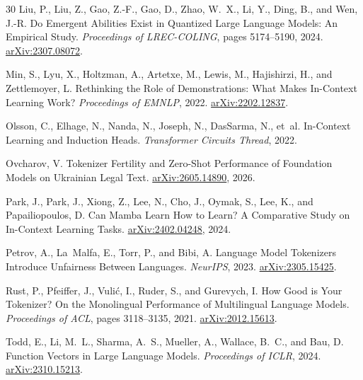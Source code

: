 \documentclass[11pt,a4paper]{article}
\begin{document}
\begin{thebibliography}{30}
Liu, P., Liu, Z., Gao, Z.-F., Gao, D., Zhao, W.~X., Li, Y., Ding, B., and Wen, J.-R.
\newblock Do Emergent Abilities Exist in Quantized Large Language Models: An Empirical Study.
\newblock \emph{Proceedings of LREC-COLING}, pages 5174--5190, 2024.
\newblock \href{https://arxiv.org/abs/2307.08072}{arXiv:2307.08072}.

Min, S., Lyu, X., Holtzman, A., Artetxe, M., Lewis, M., Hajishirzi, H., and Zettlemoyer, L.
\newblock Rethinking the Role of Demonstrations: What Makes In-Context Learning Work?
\newblock \emph{Proceedings of EMNLP}, 2022.
\newblock \href{https://arxiv.org/abs/2202.12837}{arXiv:2202.12837}.

Olsson, C., Elhage, N., Nanda, N., Joseph, N., DasSarma, N., et~al.
\newblock In-Context Learning and Induction Heads.
\newblock \emph{Transformer Circuits Thread}, 2022.

Ovcharov, V.
\newblock Tokenizer Fertility and Zero-Shot Performance of Foundation Models on Ukrainian Legal Text.
\newblock \href{https://arxiv.org/abs/2605.14890}{arXiv:2605.14890}, 2026.

Park, J., Park, J., Xiong, Z., Lee, N., Cho, J., Oymak, S., Lee, K., and Papailiopoulos, D.
\newblock Can Mamba Learn How to Learn? A Comparative Study on In-Context Learning Tasks.
\newblock \href{https://arxiv.org/abs/2402.04248}{arXiv:2402.04248}, 2024.

Petrov, A., La~Malfa, E., Torr, P., and Bibi, A.
\newblock Language Model Tokenizers Introduce Unfairness Between Languages.
\newblock \emph{NeurIPS}, 2023.
\newblock \href{https://arxiv.org/abs/2305.15425}{arXiv:2305.15425}.

Rust, P., Pfeiffer, J., Vuli\'{c}, I., Ruder, S., and Gurevych, I.
\newblock How Good is Your Tokenizer? On the Monolingual Performance of Multilingual Language Models.
\newblock \emph{Proceedings of ACL}, pages 3118--3135, 2021.
\newblock \href{https://arxiv.org/abs/2012.15613}{arXiv:2012.15613}.

Todd, E., Li, M.~L., Sharma, A.~S., Mueller, A., Wallace, B.~C., and Bau, D.
\newblock Function Vectors in Large Language Models.
\newblock \emph{Proceedings of ICLR}, 2024.
\newblock \href{https://arxiv.org/abs/2310.15213}{arXiv:2310.15213}.


\end{thebibliography}
\end{document}
